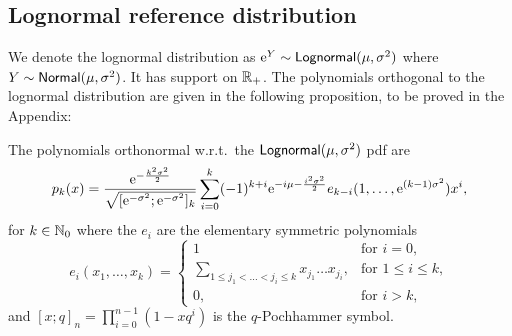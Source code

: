 

\subsection{Lognormal reference distribution}\label{SS:LogNNu}
We denote the lognormal distribution as $\mathrm{e}^Y \sim \mathsf{Lognormal}(\mu, \sigma^2)$ where $Y \sim \mathsf{Normal}(\mu, \sigma^2)$. It has support on $\mathbb{R}_+$. The polynomials orthogonal to the lognormal distribution are given in the following proposition, to be proved in the Appendix:

\begin{theorem}\label{LogNormalOrthogonalPolynomialProposition}
The polynomials orthonormal w.r.t.\ the $\mathsf{Lognormal}(\mu, \sigma^2)$ pdf are
\begin{equation}\label{eq:OrthonormalPolynomialLogNormalExpression}
p_{k}(x) = \frac{ \mathrm{e}^{-\frac{k^{2}\sigma^{2}}{2}} }{ \sqrt{[\mathrm{e}^{-\sigma^{2}} ; \mathrm{e}^{-\sigma^{2}}]_k} } \sum_{i=0}^{k}(-1)^{k+i}\mathrm{e}^{-i\mu-\frac{i^{2}\sigma^{2}}{2}}e_{k-i}(1,\ldots,\mathrm{e}^{(k-1)\sigma^{2}})x^{i},
\end{equation}
for $k\in\mathbb{N}_0$ where the $e_i$ are the elementary symmetric polynomials
\begin{equation}\label{eq:ElementarySymmetricPolynomial}
e_i(x_{1},\ldots,x_{k}) =
\begin{cases}
1 &\mbox{for } i = 0, \\
\sum_{1\leq j_{1}<\ldots<j_{i}\leq k}x_{j_{1}}\ldots x_{j_{i}}, &\mbox{for } 1 \leq i\leq k, \\
0,& \mbox{for } i>k,
\end{cases}
\end{equation}
and $[x; q]_{n}=\prod_{i=0}^{n-1}\left(1-xq^{i}\right)$ is the $q$-Pochhammer symbol.
\end{theorem}

